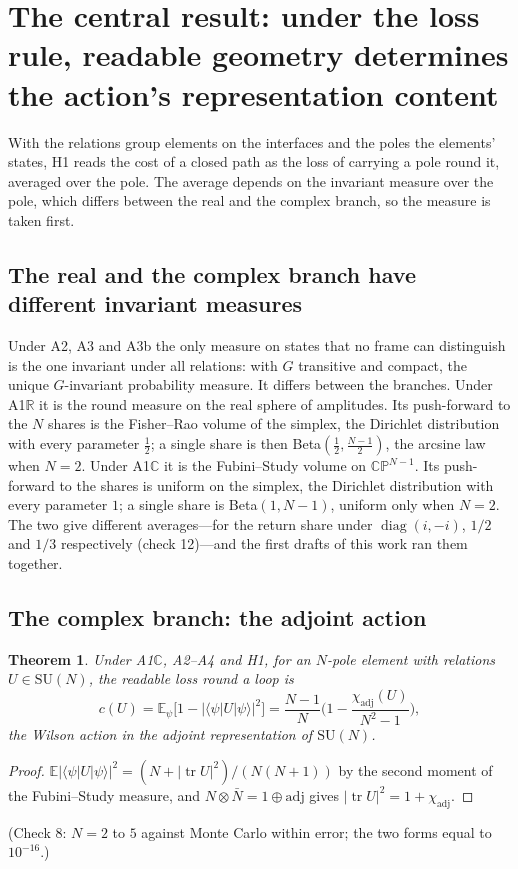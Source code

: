 \documentclass[11pt,a4paper]{article}
\theoremstyle{plain}
\newtheorem{theorem}{Theorem}
\theoremstyle{definition}
\theoremstyle{remark}
\newcommand{\tr}{\operatorname{tr}}
\newcommand{\E}{\mathbb{E}}
\newcommand{\R}{\mathbb{R}}
\newcommand{\C}{\mathbb{C}}
\newcommand{\CP}{\mathbb{CP}}
\newcommand{\SU}{\mathrm{SU}}
\newcommand{\adj}{\mathrm{adj}}
\newcommand{\diag}{\operatorname{diag}}
\begin{document}
\clearpage
\section{The central result: under the loss rule, readable geometry determines the action's representation content}\label{sec:central}

With the relations group elements on the interfaces and the poles the elements' states, H1 reads the cost of a closed path as the loss of carrying a pole round it, averaged over the pole. The average depends on the invariant measure over the pole, which differs between the real and the complex branch, so the measure is taken first.

\subsection{The real and the complex branch have different invariant measures}

Under A2, A3 and A3b the only measure on states that no frame can distinguish is the one invariant under all relations: with $G$ transitive and compact, the unique $G$-invariant probability measure. It differs between the branches. Under A1$\R$ it is the round measure on the real sphere of amplitudes. Its push-forward to the $N$ shares is the Fisher--Rao volume of the simplex, the Dirichlet distribution with every parameter $\tfrac12$; a single share is then Beta$(\tfrac12,\tfrac{N-1}{2})$, the arcsine law when $N=2$. Under A1$\C$ it is the Fubini--Study volume on $\CP^{N-1}$. Its push-forward to the shares is uniform on the simplex, the Dirichlet distribution with every parameter $1$; a single share is Beta$(1,N-1)$, uniform only when $N=2$. The two give different averages---for the return share under $\diag(i,-i)$, $1/2$ and $1/3$ respectively (check 12)---and the first drafts of this work ran them together.

\subsection{The complex branch: the adjoint action}

\begin{theorem}\label{thm:adjoint}
Under A1$\C$, A2--A4 and H1, for an $N$-pole element with relations $U\in\SU(N)$, the readable loss round a loop is
\begin{equation}
c(U)=\E_\psi\big[1-|\langle\psi|U|\psi\rangle|^2\big]=\frac{N-1}{N}\Big(1-\frac{\chi_{\adj}(U)}{N^2-1}\Big),
\end{equation}
the Wilson action in the adjoint representation of $\SU(N)$.
\end{theorem}
\begin{proof}
$\E|\langle\psi|U|\psi\rangle|^2=(N+|\tr U|^2)/(N(N+1))$ by the second moment of the Fubini--Study measure, and $N\otimes\bar N=1\oplus\adj$ gives $|\tr U|^2=1+\chi_{\adj}$.
\end{proof}
(Check 8: $N=2$ to $5$ against Monte Carlo within error; the two forms equal to $10^{-16}$.)
\end{document}
